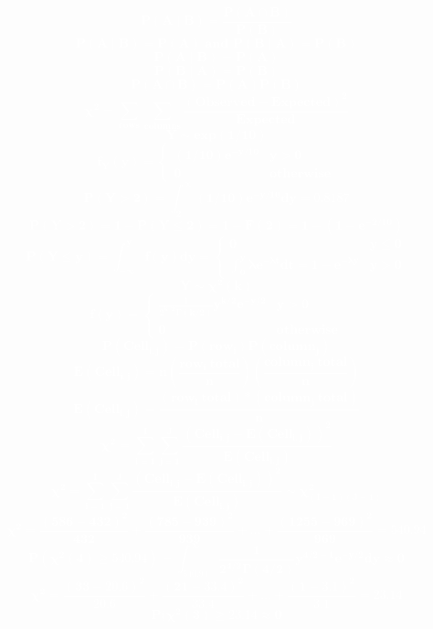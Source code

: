 \documentclass[12pt,portrait,semhelv,semrot]{article}
\begin{document}
	\normalsize

\textcolor{white}{\textbf{
$$\boldsymbol{P(A \mid B)  = \frac{P(A \cap B)}{P(B)} }$$
$$\boldsymbol{P(A \mid B)  = P(A) \mbox{ and } P(B\mid A) = P(B)}$$
$$\boldsymbol{P(A \mid B)  = P(A)}$$
$$\boldsymbol{P(B\mid A) = P(B)}$$
$$\boldsymbol{P(A\cap B) = P(A)P(B)}$$
$$\boldsymbol{\chi^2 = \sum_{rows}\sum_{columns}\frac{(Observed-Expected)^2}{Expected}}$$
$$\boldsymbol{Y\sim exp(1/10)}$$
$$\boldsymbol{f_Y(y) = \begin{cases} (1/10)e^{-y/10} & y >0 \\ 0 & otherwise\end{cases}}$$
$$\boldsymbol{P(Y>2) = \int_2^{\infty}(1/10)e^{-y/10}dy = 0.8187}$$
$$\boldsymbol{P(Y>2) = 1-P(Y\leq 2) = 1-F(2) = 1-(1 - e^{-2/10})}$$
$$\boldsymbol{P(Y\leq y) = \int_{-\infty}^yf(y)dy = \begin{cases} 0 & y\leq 0\\ \int_0^{y} \lambda e^{-\lambda t}dt = 1-e^{-\lambda y} & y > 0\end{cases}}$$
$$\boldsymbol{Y\sim \chi^2(k)}$$
$$\boldsymbol{f(y) = \begin{cases}\frac{1}{2^{k/2}\Gamma(k/2)}y^{k/2}e^{-y/2} & y>0 \\ 0 & otherwise\end{cases}}$$
$$\boldsymbol{P(Cell_{i,j}) = P(row_i)P(column_j)}$$
$$\boldsymbol{E(Cell_{i,j}) = n\left(\frac{row_i~total}{n}\right)\left(\frac{column_j~total}{n}\right)}$$
$$\boldsymbol{E(Cell_{i,j}) = \frac{(row_i~total)*(column_j~total)}{n}}$$
$$\boldsymbol{\chi^2 = \sum_{i = 1}^I\sum_{j =1}^J\frac{(Cell_{i,j}-E(Cell_{i,j}))^2}{E(Cell_{i,j})}}$$
$$\boldsymbol{\chi^2 = \sum_{i = 1}^I\sum_{j =1}^J\frac{(Cell_{i,j}-E(Cell_{i,j}))^2}{E(Cell_{i,j})}\sim\chi^2_{(I-1)(J-1)}}$$
$$\boldsymbol{\chi^2 = \frac{(586-432)^2}{432} + \frac{(785-939)^2}{939} + ... + \frac{(1255-969)^2}{969} = 540.94}$$
$$\boldsymbol{P(\chi^2(4) \geq 540.94) = \int_{540.94}^{\infty}\frac{1}{2^{4/2}\Gamma(4/2)}y^{4/2-1}e^{-y/2}dy \approx 0}$$
$$\boldsymbol{\chi^2 = \frac{(33-20.6)^2}{20.6} + \frac{(21-33.4)^2}{33.4} + ... + \frac{(1-3.1)^2}{3.1} =23.14}$$
$$\boldsymbol{P(\chi^2(3) \geq 23.14 \approx 0}$$
}}
\end{document}
